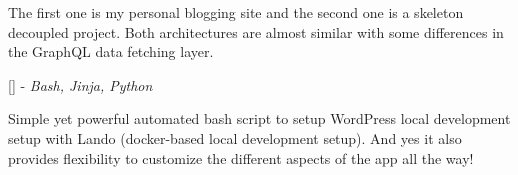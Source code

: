 \documentclass[]{resume}
\begin{document}
           The first one is my personal blogging site and the second one is a skeleton decoupled project. Both architectures are almost similar with some differences in the GraphQL data fetching layer.\\

           \sectionsep

           [\textbf{\href{https://github.com/Souptik2001/wordpress.setup}{}}] - \textit{Bash, Jinja, Python}

           Simple yet powerful automated bash script to setup WordPress local development setup with Lando (docker-based local development setup). And yes it also provides flexibility to customize the different aspects of the app all the way!

           \sectionsep


     \ 
     
\end{document}
